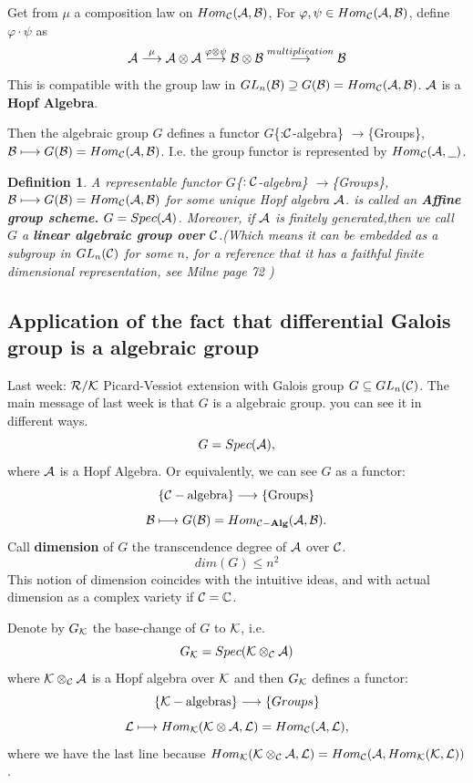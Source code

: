 \documentclass[11pt]{article}
\newtheorem{dfn}[thm]{Definition}
\newcommand{\cplx}{\mathbb C}
\newcommand{\cala}{{\cal A}}
\newcommand{\calb}{{\cal B}}
\newcommand{\calc}{{\cal C}}
\newcommand{\calk}{{\cal K}}
\newcommand{\call}{{\cal L}}
\newcommand{\calr}{{\cal R}}
\newcommand{\mathbold}{\bf}
\newcommand{\alg}{{\mathbold Alg}}
\newcommand{\lrta}{\longrightarrow}
\begin{document}
Get from $\mu$ a composition law on $Hom_\calc(\cala,\calb)$, For $\varphi,\psi\in Hom_\calc(\cala,\calb)$, define $\varphi\cdot\psi$ as 
$$
\cala\overset{\mu}{\lrta}\cala\otimes\cala\overset{\varphi\otimes\psi}{\lrta}\calb\otimes \calb\overset{multiplication}{\lrta}\calb
$$
This is compatible with the group law in $GL_n(\calb)\supseteq G(\calb)=Hom_\calc(\cala,\calb)$. 
$\cala$ is a \textbf{Hopf Algebra}.

Then the algebraic group $G$ defines a functor
$G$\{:$\calc$-algebra\} $\lrta$\{Groups\}, $\calb\longmapsto G(\calb)=Hom_\calc(\cala,\calb)$. I.e. the group functor is represented by $Hom_\calc(\cala,\underline{\ \ })$.

\begin{dfn}
A representable functor $G$\{$:\calc$-algebra\} $\lrta$\{Groups\}, $\calb\longmapsto G(\calb)=Hom_\calc(\cala,\calb)$ for some unique Hopf algebra $\cala$. is called an \textbf{Affine group scheme.} $G=Spec(\cala)$. Moreover, if $\cala$ is finitely generated,then we call $G$ a \textbf{linear algebraic group over $\calc$}.(Which means it can be embedded as a subgroup in $GL_n(\calc)$ for some $n$, for a reference that it has a faithful finite dimensional representation, see Milne page 72 )
\end{dfn}


\subsection*{Application of the fact that differential Galois group is a algebraic group}

Last week: $\calr/\calk$ Picard-Vessiot extension with Galois group $G\subseteq GL_n(\calc)$. The main message of last week is that $G$ is a algebraic group. you can see it in different ways.
$$
G=Spec(\cala),
$$
where $\cala$ is a Hopf Algebra. Or equivalently, we can see $G$ as a functor:
$$
\{\calc-\text{algebra}\}\lrta\{\text{Groups}\}
$$
$$
\calb\longmapsto G(\calb)=Hom_{\calc-\alg}(\cala,\calb).
$$
Call \textbf{dimension} of $G$ the transcendence degree of $\cala$ over $\calc$.
$$
dim(G)\leq n^2
$$
This notion of dimension coincides with the intuitive ideas, and with actual dimension as a complex variety if $\calc=\cplx$.

Denote by $G_\calk$ the base-change of $G$ to $\calk$, i.e.
$$
G_\calk=Spec(\calk\otimes_\calc\cala)
$$
where $\calk\otimes_\calc\cala$ is a Hopf algebra over $\calk$ and then $G_\calk$ defines a functor:
$$
\{\calk-\text{algebras}\}\lrta\{Groups\}
$$
$$
\call\longmapsto Hom_\calk(\calk\otimes \cala,\call)=Hom_{\calc}(\cala,\call),
$$
where we have the last line because $Hom_\calk(\calk\otimes_\calc\cala,\call)=Hom_\calc(\cala,Hom_\calk(\calk,\call))$.
\end{document}

